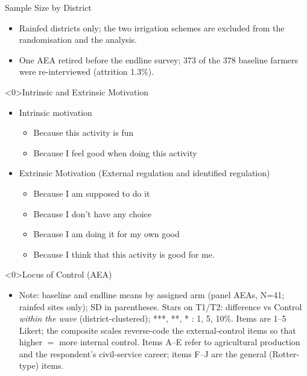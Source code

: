 \documentclass[aspectratio=169]{beamer}
\newcommand{\notefont}{\fontsize{5pt}{6pt}\selectfont}
\begin{document}
\begin{frame}{Sample Size by District}
\centering
{}
\vspace{4pt}
\begin{itemize}\notefont
	\item Rainfed districts only; the two irrigation schemes are excluded from the randomisation and the analysis.
	\item One AEA retired before the endline survey; 373 of the 378 baseline farmers were re-interviewed (attrition 1.3\%).
\end{itemize}
\end{frame}

\begin{frame}<0>{Intrinsic and Extrinsic Motivation}
	\begin{itemize}
		\item Intrinsic motivation
		\begin{itemize}
			\item Because this activity is fun 
			\item Because I feel good when doing this activity
			\vspace{0.3cm}
		\end{itemize}
		\item Extrinsic Motivation (External regulation and identified regulation)
		\begin{itemize}
			\item Because I am supposed to do it
			\item Because I don't have any choice
			\item Because I am doing it for my own good 
			\item Because I think that this activity is good for me. 
		\end{itemize}
		
	\end{itemize}
\end{frame}

\begin{frame}<0>{Locus of Control (AEA)}
	\centering
	\begin{itemize}\notefont
		\item Note: baseline and endline means by assigned arm (panel AEAs, N=41; rainfed sites only); SD in
		parentheses. Stars on T1/T2: difference vs Control \emph{within the wave}
		(district-clustered); ***, **, * : 1, 5, 10\%. Items are 1--5 Likert; the composite
		scales reverse-code the external-control items so that higher $=$ more internal control.
		Items A--E refer to agricultural production and the respondent's civil-service career;
		items F--J are the general (Rotter-type) items.
	\end{itemize}
\end{frame}
\end{document}
